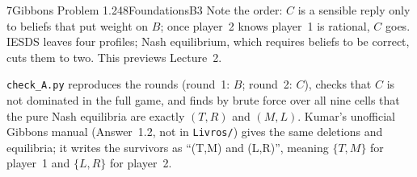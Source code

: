 \begin{exsol}{7}{Gibbons Problem 1.2}{48}{Foundations}{B3}
\interp Note the order: $C$ is a sensible reply only to beliefs that put weight on $B$; once
player~2 knows player~1 is rational, $C$ goes. IESDS leaves four profiles; Nash equilibrium,
which requires beliefs to be correct, cuts them to two. This previews Lecture~2.

\verify \texttt{check\_A.py} reproduces the rounds (round~1: $B$; round~2: $C$), checks that $C$
is not dominated in the full game, and finds by brute force over all nine cells that the pure
Nash equilibria are exactly $(T,R)$ and $(M,L)$. Kumar's unofficial Gibbons manual (Answer~1.2,
not in \texttt{Livros/}) gives the same deletions and equilibria; it writes the survivors as
``(T,M) and (L,R)'', meaning $\{T,M\}$ for player~1 and $\{L,R\}$ for player~2.

\end{exsol}

